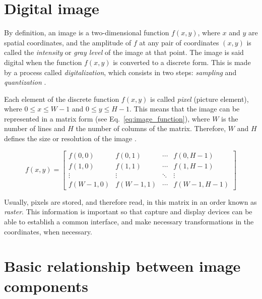 \section{Digital image}
\label{sec:digital_image}
By definition, an image is a two-dimensional function $f(x, y)$, where $x$ and $y$ are spatial coordinates, and the amplitude of $f$ at any pair of coordinates $(x, y)$ is called the \textit{intensity} or \textit{gray level} of the image at that point. The image is said digital when the function $f(x, y)$ is converted to a discrete form. This is made by a process called \textit{digitalization}, which consists in two steps: \textit{sampling} and \textit{quantization} \citep{gonzalez:02}.

Each element of the discrete function $f(x, y)$ is called \textit{pixel} (picture element), where $0 \leq x \leq W - 1$ and $0 \leq y \leq H - 1$. This means that the image can be represented in a matrix form (see Eq.~\ref{eq:image_function}), where $W$ is the number of lines and $H$ the number of columns of the matrix. Therefore, $W$ and $H$ defines the size or resolution of the image \citep{pedrini:08}.

\begin{equation*}
f(x, y) = 
 \begin{bmatrix}
  f(0, 0)     & f(0, 1)     & \cdots & f(0, H - 1) \\
  f(1, 0)     & f(1, 1)     & \cdots & f(1, H - 1) \\
  \vdots      & \vdots      & \ddots & \vdots  \\
  f(W - 1, 0) & f(W - 1, 1) & \cdots & f(W - 1, H - 1) 
 \end{bmatrix}
\label{eq:image_function}
\end{equation*}

Usually, pixels are stored, and therefore read, in this matrix in an order known as \textit{raster}. This information is important so that capture and display devices can be able to establish a common interface, and make necessary transformations in the coordinates, when necessary.

\section{Basic relationship between image components}
\label{sec:image_components_relation}

